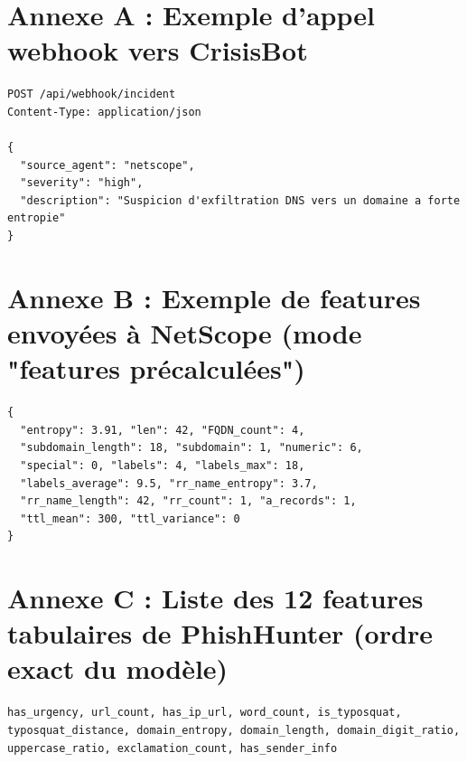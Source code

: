\documentclass[12pt,a4paper]{report}
\begin{document}
\section*{Annexe A : Exemple d'appel webhook vers CrisisBot}
\begingroup\small
\begin{verbatim}
POST /api/webhook/incident
Content-Type: application/json

{
  "source_agent": "netscope",
  "severity": "high",
  "description": "Suspicion d'exfiltration DNS vers un domaine a forte entropie"
}
\end{verbatim}
\endgroup

\section*{Annexe B : Exemple de features envoyées à NetScope (mode "features précalculées")}
\begingroup\small
\begin{verbatim}
{
  "entropy": 3.91, "len": 42, "FQDN_count": 4,
  "subdomain_length": 18, "subdomain": 1, "numeric": 6,
  "special": 0, "labels": 4, "labels_max": 18,
  "labels_average": 9.5, "rr_name_entropy": 3.7,
  "rr_name_length": 42, "rr_count": 1, "a_records": 1,
  "ttl_mean": 300, "ttl_variance": 0
}
\end{verbatim}
\endgroup

\section*{Annexe C : Liste des 12 features tabulaires de PhishHunter (ordre exact du modèle)}
\begingroup\small
\begin{verbatim}
has_urgency, url_count, has_ip_url, word_count, is_typosquat,
typosquat_distance, domain_entropy, domain_length, domain_digit_ratio,
uppercase_ratio, exclamation_count, has_sender_info
\end{verbatim}
\endgroup
\end{document}
